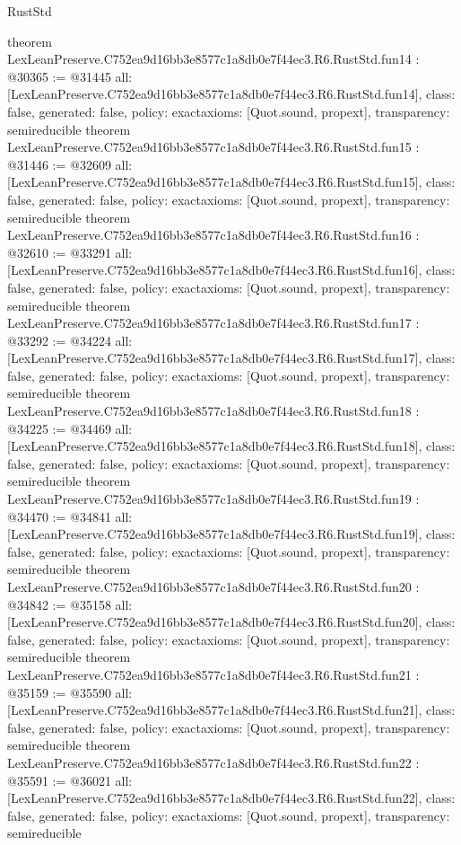 \begin{lexlean}{RustStd}
\begin{coremodule}
{}
theorem LexLeanPreserve.C752ea9d16bb3e8577c1a8db0e7f44ec3.R6.RustStd.fun14 : @30365 := @31445 {
  all: [LexLeanPreserve.C752ea9d16bb3e8577c1a8db0e7f44ec3.R6.RustStd.fun14],
  class: false,
  generated: false,
  policy: exact{axioms: [Quot.sound, propext]},
  transparency: semireducible
}
theorem LexLeanPreserve.C752ea9d16bb3e8577c1a8db0e7f44ec3.R6.RustStd.fun15 : @31446 := @32609 {
  all: [LexLeanPreserve.C752ea9d16bb3e8577c1a8db0e7f44ec3.R6.RustStd.fun15],
  class: false,
  generated: false,
  policy: exact{axioms: [Quot.sound, propext]},
  transparency: semireducible
}
theorem LexLeanPreserve.C752ea9d16bb3e8577c1a8db0e7f44ec3.R6.RustStd.fun16 : @32610 := @33291 {
  all: [LexLeanPreserve.C752ea9d16bb3e8577c1a8db0e7f44ec3.R6.RustStd.fun16],
  class: false,
  generated: false,
  policy: exact{axioms: [Quot.sound, propext]},
  transparency: semireducible
}
theorem LexLeanPreserve.C752ea9d16bb3e8577c1a8db0e7f44ec3.R6.RustStd.fun17 : @33292 := @34224 {
  all: [LexLeanPreserve.C752ea9d16bb3e8577c1a8db0e7f44ec3.R6.RustStd.fun17],
  class: false,
  generated: false,
  policy: exact{axioms: [Quot.sound, propext]},
  transparency: semireducible
}
theorem LexLeanPreserve.C752ea9d16bb3e8577c1a8db0e7f44ec3.R6.RustStd.fun18 : @34225 := @34469 {
  all: [LexLeanPreserve.C752ea9d16bb3e8577c1a8db0e7f44ec3.R6.RustStd.fun18],
  class: false,
  generated: false,
  policy: exact{axioms: [Quot.sound, propext]},
  transparency: semireducible
}
theorem LexLeanPreserve.C752ea9d16bb3e8577c1a8db0e7f44ec3.R6.RustStd.fun19 : @34470 := @34841 {
  all: [LexLeanPreserve.C752ea9d16bb3e8577c1a8db0e7f44ec3.R6.RustStd.fun19],
  class: false,
  generated: false,
  policy: exact{axioms: [Quot.sound, propext]},
  transparency: semireducible
}
theorem LexLeanPreserve.C752ea9d16bb3e8577c1a8db0e7f44ec3.R6.RustStd.fun20 : @34842 := @35158 {
  all: [LexLeanPreserve.C752ea9d16bb3e8577c1a8db0e7f44ec3.R6.RustStd.fun20],
  class: false,
  generated: false,
  policy: exact{axioms: [Quot.sound, propext]},
  transparency: semireducible
}
theorem LexLeanPreserve.C752ea9d16bb3e8577c1a8db0e7f44ec3.R6.RustStd.fun21 : @35159 := @35590 {
  all: [LexLeanPreserve.C752ea9d16bb3e8577c1a8db0e7f44ec3.R6.RustStd.fun21],
  class: false,
  generated: false,
  policy: exact{axioms: [Quot.sound, propext]},
  transparency: semireducible
}
theorem LexLeanPreserve.C752ea9d16bb3e8577c1a8db0e7f44ec3.R6.RustStd.fun22 : @35591 := @36021 {
  all: [LexLeanPreserve.C752ea9d16bb3e8577c1a8db0e7f44ec3.R6.RustStd.fun22],
  class: false,
  generated: false,
  policy: exact{axioms: [Quot.sound, propext]},
  transparency: semireducible
}
\end{coremodule}
\end{lexlean}
